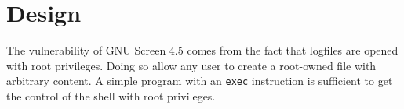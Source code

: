 \section{Design}
The vulnerability of GNU Screen 4.5 comes from the fact that logfiles are opened with root privileges. Doing so allow any user to create a root-owned file with arbitrary content. A simple program with an {\tt exec} instruction is sufficient to get the control of the shell with root privileges.
